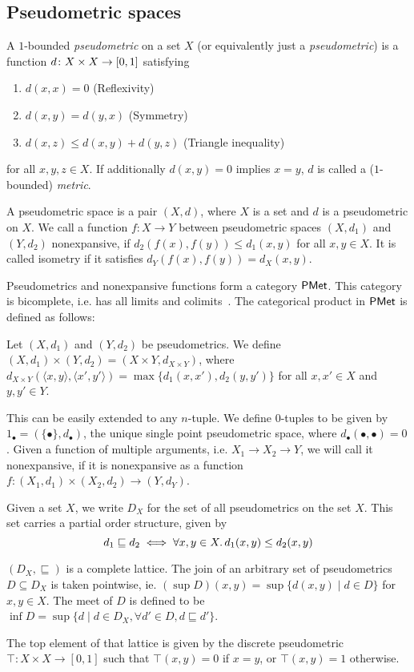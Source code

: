 \subsection{Pseudometric spaces}\label{c2:subsec:pseudometric_spaces}
A $1$-bounded \emph{pseudometric} on a set $X$ (or equivalently just a \emph{pseudometric}) is a function $d \colon X \times X \to \interval{0}{1}$ satisfying
\begin{enumerate}
	\item  $d(x,x)=0$ (Reflexivity)
	\item  $d(x,y)=d(y,x)$ ({Symmetry})
	\item  $d(x,z) \leq d(x, y) + d(y,z)$ (Triangle inequality)
\end{enumerate}
for all $x,y,z \in X$. If additionally $d(x,y)=0$ implies $x=y$, $d$ is called a ($1$-bounded) \emph{metric}. 
\begin{definition}
	A pseudometric space is a pair $(X, d)$, where $X$ is a set and $d$ is a pseudometric on $X$. We call a function $f \colon X \to Y$ between pseudometric spaces $(X,d_1)$ and $(Y,d_2)$ nonexpansive, if $d_2(f(x),f(y))\leq d_1(x,y)$ for all $x,y \in X$. It is called isometry if it satisfies $d_Y(f(x),f(y))=d_X(x,y)$. 	
\end{definition}
Pseudometrics and nonexpansive functions form a category $\mathsf{PMet}$. This category is bicomplete, i.e. has all limits and colimits~\cite[Theorem~3.8]{Baldan:2018:Coalgebraic}. The categorical product in $\mathsf{PMet}$ is defined as follows:
\begin{definition}
Let $(X,d_1)$ and $(Y, d_2)$ be pseudometrics. We define $(X, d_1) \times (Y, d_2) = (X \times Y, d_{X \times Y})$, where $d_{X \times Y}(\langle x,y \rangle,\langle x',y' \rangle ) = \max \{d_1(x,x'), d_2(y,y')\}$ for all $x,x' \in X$ and $y,y' \in Y$.
\end{definition}
This can be easily extended to any $n$-tuple. We define $0$-tuples to be given by $1_{\bullet} = (\{\bullet\}, d_{\bullet})$, the unique single point pseudometric space, where $d_{\bullet}(\bullet,\bullet)=0$. Given a function of multiple arguments, i.e. $X_1 \to X_2 \to Y$, we will call it nonexpansive, if it is nonexpansive as a function $f \colon (X_1, d_{1}) \times (X_2, d_{2}) \to (Y, d_Y)$. 	


Given a set $X$, we write $D_X$ for the set of all pseudometrics on the set $X$. This set carries a partial order structure, given by
$$d_1 \sqsubseteq d_2 \iff \forall x,y \in X \ldotp d_1(x,y) \leq d_2(x,y)$$  
\begin{lemma}\label{c2:lem:pseudometrics_complete_lattice}
    $(D_X, \sqsubseteq )$ is a complete lattice. The join of an arbitrary set of pseudometrics $D \subseteq D_X$ is taken pointwise, ie. $\left(\sup D \right)(x,y) = \sup \{ d(x,y) \mid d \in D\}$ for $x, y \in X$. The meet of $D$ is defined to be $\inf D = \sup \{ d \mid d \in D_X , \forall {d' \in D}, d \sqsubseteq d'\}$.
\end{lemma}
The top element of that lattice is given by the discrete pseudometric $\top \colon X \times X \to [0,1]$ such that $\top(x,y) = 0$ if $x=y$, or $\top(x,y)=1$ otherwise.

